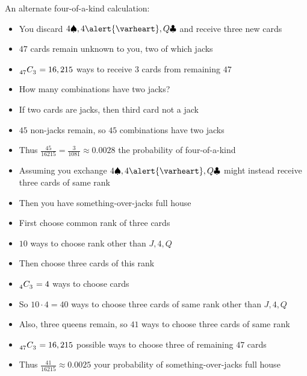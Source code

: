 \documentclass[handout,xcolor=dvipsnames]{beamer}
\theoremstyle{definition}
\newcommand\ncr[2]{\tensor[_{#1}]C{_{#2}}}
\newcommand{\hs}{\alert{\varheart}}
\newcommand{\s}{\spadesuit}
\newcommand{\cs}{\clubsuit}
\begin{document}
\begin{frame}
An alternate four-of-a-kind calculation:
\begin{itemize}
\item You discard $4\s,4\hs,Q\cs$ and receive three new cards
\item $47$ cards remain unknown to you, two of which jacks
\item $\ncr{47}{3}=16,215$ ways to receive $3$ cards from remaining $47$
\item How many combinations have two jacks?
\item If two cards are jacks, then third card not a jack
\item $45$ non-jacks remain, so $45$ combinations
have two jacks
\item Thus $\frac{45}{16215}=\frac{3}{1081}\approx 0.0028$
the probability of four-of-a-kind
\end{itemize}
\end{frame}

\begin{frame}
\begin{itemize}
\item Assuming you exchange $4\s,4\hs,Q\cs$
might instead receive three cards of same rank
\item Then you have \alert{something-over-jacks full house}
\item First choose common rank of three cards
\item $10$ ways to choose rank other than $J,4,Q$
\item Then choose three cards of this rank
\item $\ncr{4}{3}=4$ ways to choose cards
\item So $10\cdot 4=40$ ways to choose three cards of
same rank other than $J,4,Q$
\item Also, three queens remain, so $41$ ways
to choose three cards of same rank
\item $\ncr{47}{3}=16,215$ possible ways to
choose three of remaining $47$ cards
\item Thus $\frac{41}{16215}\approx 0.0025$
your probability of something-over-jacks full house
\end{itemize}
\end{frame}
\end{document}
